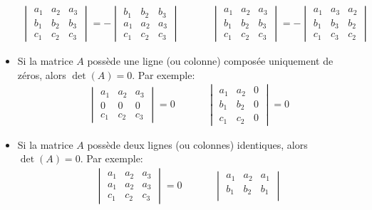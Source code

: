 \documentclass[]{book}
\theoremstyle{definition}
\theoremstyle{definition}
\theoremstyle{definition}
\theoremstyle{remark}
\begin{document}
\begin{itemize}
  \begin{align*}
  \begin{vmatrix}
  a_1 & a_2 & a_3 \\
  b_1 & b_2 & b_3 \\
  c_1 & c_2 & c_3
  \end{vmatrix}
  =
  -\begin{vmatrix}
  b_1 & b_2 & b_3 \\
  a_1 & a_2 & a_3 \\
  c_1 & c_2 & c_3
  \end{vmatrix}
  &
  \phantom{aaa}
  &
  \begin{vmatrix}
  a_1 & a_2 & a_3 \\
  b_1 & b_2 & b_3 \\
  c_1 & c_2 & c_3
  \end{vmatrix}
  =
  -\begin{vmatrix}
  a_1 & a_3 & a_2 \\
  b_1 & b_3 & b_2 \\
  c_1 & c_3 & c_2
  \end{vmatrix}
  \end{align*}
\item
  Si la matrice \(A\) possède une ligne (ou colonne) composée uniquement de zéros, alors \(\det(A)=0\). Par exemple:
  \begin{align*}
  \begin{vmatrix}
  a_1 & a_2 & a_3 \\
  0 & 0 & 0 \\
  c_1 & c_2 & c_3
  \end{vmatrix}
  =
  0
  &
  \phantom{aaa}
  &
  \begin{vmatrix}
  a_1 & a_2 & 0 \\
  b_1 & b_2 & 0 \\
  c_1 & c_2 & 0
  \end{vmatrix}
  =0
  \end{align*}
\item
  Si la matrice \(A\) possède deux lignes (ou colonnes) identiques, alors \(\det(A)=0\). Par exemple:
  \begin{align*}
  \begin{vmatrix}
  a_1 & a_2 & a_3 \\
  a_1 & a_2 & a_3 \\
  c_1 & c_2 & c_3
  \end{vmatrix}
  =
  0
  &
  \phantom{aaa}
  &
  \begin{vmatrix}
  a_1 & a_2 & a_1 \\
  b_1 & b_2 & b_1 \\

\end{vmatrix}
\end{align*}
\end{itemize}
\end{document}
